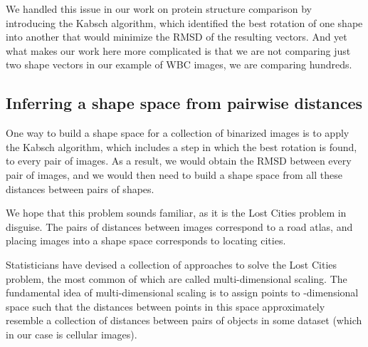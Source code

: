 We handled this issue in our work on protein structure comparison by introducing the Kabsch algorithm, which identified the best rotation of one shape into another that would minimize the RMSD of the resulting vectors. And yet what makes our work here more complicated is that we are not comparing just two shape vectors in our example of WBC images, we are comparing hundreds.

\FloatBarrier
{}
\subsection{Inferring a shape space from pairwise distances}

One way to build a shape space for a collection of binarized images is to apply the Kabsch algorithm, which includes a step in which the best rotation is found, to every pair of images. As a result, we would obtain the RMSD between every pair of images, and we would then need to build a shape space from all these distances between pairs of shapes.\\

\begin{note}\end{note}

We hope that this problem sounds familiar, as it is the Lost Cities problem in disguise. The pairs of distances between images correspond to a road atlas, and placing images into a shape space corresponds to locating cities.

Statisticians have devised a collection of approaches to solve the Lost Cities problem, the most common of which are called multi-dimensional scaling. The fundamental idea of multi-dimensional scaling is to assign points to -dimensional space such that the distances between points in this space approximately resemble a collection of distances between pairs of objects in some dataset (which in our case is cellular images).\\

\begin{qbox}\end{qbox}

